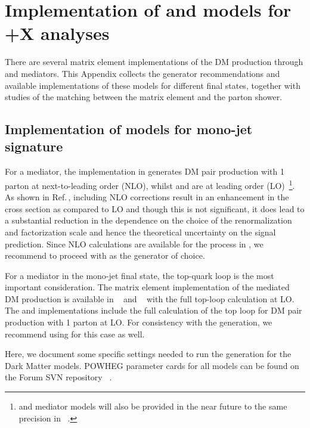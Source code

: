 \section{\texorpdfstring{Implementation of \schannel and \tchannel models for \MET+X analyses}{Implementation of \schannel and \tchannel models for MET+X analyses}}

There are several matrix element implementations of the
DM production through \spinzero and \spinone mediators. This Appendix collects the 
generator recommendations and available implementations
of these models for different final states, together with studies 
of the matching between the matrix element and the parton shower. 

\subsection{Implementation of models for mono-jet signature}
\label{sec:monojet_implementation}

For a \spinone mediator, the implementation in \powheg generates
DM pair production with 1 parton at next-to-leading order (NLO), 
whilst \madgraph and \mcfm are at leading order (LO)~\footnote{\spinzero and \spinone 
mediator models will also be provided 
in the near future to the same precision in \madgraph~\cite{Alwall:1405.0301}.}. As shown in \powheg Ref.\,\cite{Haisch:2013ata}, including NLO corrections result in an enhancement in the cross section as compared to LO and though this is not significant, it does lead to a substantial reduction in the dependence on the choice of the renormalization and factorization scale and hence the theoretical uncertainty on the signal prediction. 
Since NLO calculations are available for the process in \powheg, we recommend to proceed with \powheg as the generator of choice. 

For a \spinzero mediator in the mono-jet final state, the top-quark loop is the most important consideration.
The matrix element implementation of the \schannel \spinzero mediated DM production is available in \mcfm~\cite{Fox:2012ru,Harris:2014hga} and \powheg~\cite{Haisch:2015ioa} with the full top-loop calculation at LO.
The \powheg and \mcfm implementations include 
the full calculation of the top loop 
for DM pair production with 1 parton at LO.
For consistency with the \spinone generation, we recommend using \powheg
for this case as well.

Here, we document some specific settings needed to run the \powheg 
generation for the Dark Matter models. POWHEG parameter cards for all models
can be found on the Forum SVN repository
~\cite{ForumSVN_DMA, ForumSVN_DMV, ForumSVN_DMS_tloop, ForumSVN_DMP_tloop}.



